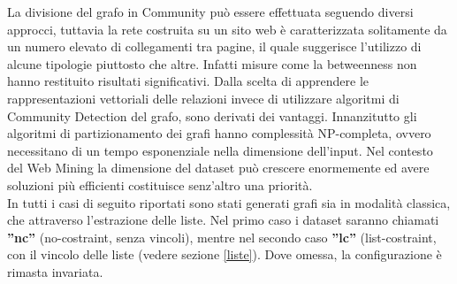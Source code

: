 La divisione del grafo in Community può essere effettuata seguendo diversi approcci, tuttavia la rete costruita su un sito web è caratterizzata solitamente da un numero elevato di collegamenti tra pagine, il quale suggerisce l'utilizzo di alcune tipologie piuttosto che altre. Infatti misure come la betweenness non hanno restituito risultati significativi.
Dalla scelta di apprendere le rappresentazioni vettoriali delle relazioni invece di utilizzare algoritmi di Community Detection del grafo, sono derivati dei vantaggi. Innanzitutto gli algoritmi di partizionamento dei grafi hanno complessità NP-completa, ovvero necessitano di un tempo esponenziale nella dimensione dell'input. Nel contesto del Web Mining la dimensione del dataset può crescere enormemente ed avere soluzioni più efficienti costituisce senz'altro una priorità. 
\\
In tutti i casi di seguito riportati sono stati generati grafi sia in modalità classica, che attraverso l'estrazione delle liste. Nel primo caso i dataset saranno chiamati \textbf{''nc''} (no-costraint, senza vincoli), mentre nel secondo caso \textbf{''lc''} (list-costraint, con il vincolo delle liste (vedere sezione \ref{liste}). Dove omessa, la configurazione è rimasta invariata.

